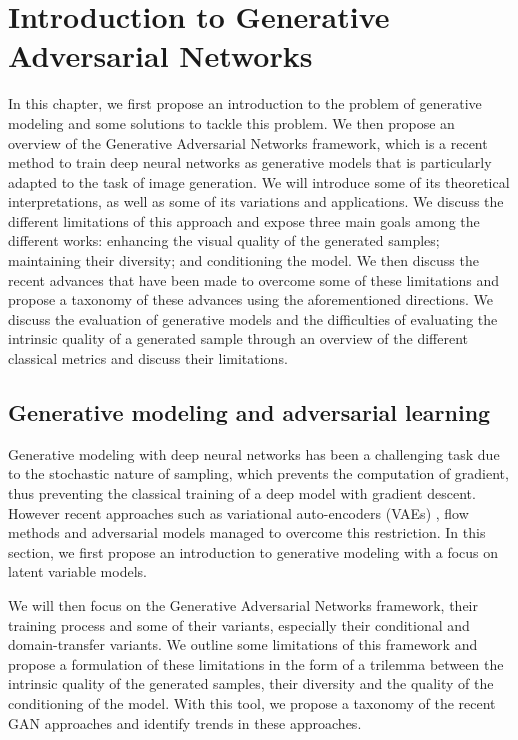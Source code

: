 \chapter{Introduction to Generative Adversarial Networks }
\label{chap:chapter1}

\begin{chapterabstract}
	In this chapter, we first propose an introduction to the problem of generative modeling and some solutions to tackle this problem. We then propose an overview of the Generative Adversarial Networks \citep{Goodfellow2014} framework, which is a recent method to train deep neural networks as generative models that is particularly adapted to the task of image generation. We will introduce some of its theoretical interpretations, as well as some of its variations and applications. We discuss the different limitations of this approach and expose three main goals among the different works: enhancing the visual quality of the generated samples; maintaining their diversity; and conditioning the model. We then discuss the recent advances that have been made to overcome some of these limitations and propose a taxonomy of these advances using the aforementioned directions. We discuss the evaluation of generative models and the difficulties of evaluating the intrinsic quality of a generated sample through an overview of the different classical metrics and discuss their limitations.
\end{chapterabstract}

\minitoc


\section{Generative modeling and adversarial learning}
Generative modeling with deep neural networks has been a challenging task due to the stochastic nature of sampling, which prevents the computation of gradient, thus preventing the classical training of a deep model with gradient descent. However recent approaches such as variational auto-encoders (\ac{VAE}s) \citep{Kingma2014b}, flow methods \citep{Dinh2017, Kingma2018} and adversarial models \citep{Goodfellow2014} managed to overcome this restriction. In this section, we first propose an introduction to generative modeling with a focus on latent variable models.

We will then focus on the Generative Adversarial Networks \citep{Goodfellow2014} framework, their training process  and some of their variants, especially their conditional and domain-transfer variants. We outline some limitations of this framework and propose a formulation of these limitations in the form of a trilemma between the intrinsic quality of the generated samples, their diversity and the quality of the conditioning of the model. With this tool, we propose a taxonomy of the recent \ac{GAN} approaches and identify trends in these approaches.


